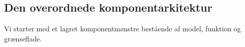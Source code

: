 \subsection{Den overordnede komponentarkitektur}
\label{sec:overordnetkomponent}

Vi starter med et lagret komponentmønstre bestående af model, funktion og grænseflade. 

\begin{figure}
  \centering
  \scalebox{0.7}{
    
  }
  \label{fig:komponenter}
\end{figure}
